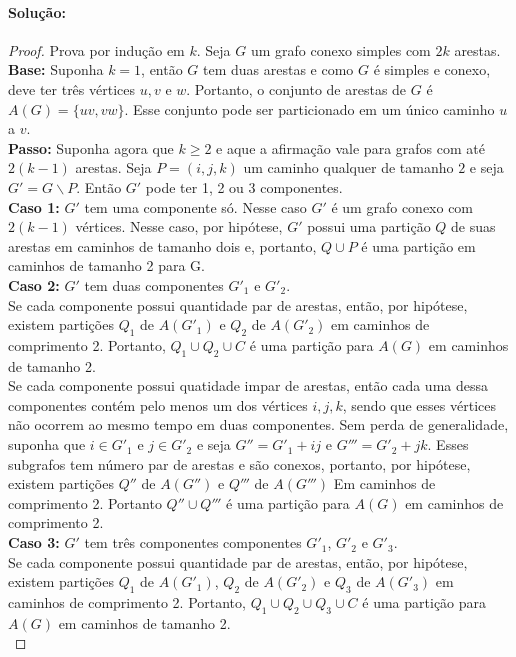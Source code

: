 \documentclass[11pt,a4paper,notitlepage]{exam}
\begin{document}
\paragraph*{Solução:}
\begin{proof}
  Prova por indução em $k$. Seja $G$ um grafo conexo simples com $2k$ arestas.\\
  \textbf{Base:}
  Suponha $k = 1$, então $G$ tem duas arestas e como $G$ é simples e conexo, deve ter três vértices $u, v$ e $w$. Portanto, o conjunto de arestas de $G$ é $A(G) = \{uv, vw\}$. Esse conjunto pode ser particionado em um único caminho $u$ a $v$.\\
  \textbf{Passo:} Suponha agora que $k \geq 2$ e aque a afirmação vale para grafos com até $2(k-1)$ arestas. Seja $P = (i,j,k)$ um caminho qualquer de tamanho $2$ e seja $G' = G \backslash P$. Então $G'$ pode ter 1, 2 ou 3 componentes.\\
  \textbf{Caso 1:} $G'$ tem uma componente só.
  Nesse caso $G'$ é um grafo conexo com $2(k-1)$ vértices. Nesse caso, por hipótese, $G'$ possui uma partição $Q$ de suas arestas em caminhos de tamanho dois e, portanto, $Q\cup P$ é uma partição em caminhos de tamanho 2 para G.\\
  \textbf{Caso 2:} $G'$ tem duas componentes $G'_1$ e $G'_2$.\\
  Se cada componente possui quantidade par de arestas, então, por hipótese, existem partições $Q_1$ de $A(G'_1)$ e $Q_2$ de $A(G'_2)$ em caminhos de comprimento 2. Portanto, $Q_1\cup Q_2 \cup C$ é uma partição para $A(G)$ em caminhos de tamanho 2.\\
  Se cada componente possui quatidade impar de arestas, então cada uma dessa componentes contém pelo menos um dos vértices $i,j,k$, sendo que esses vértices não ocorrem ao mesmo tempo em duas componentes. Sem perda de generalidade, suponha que $i \in G'_1$ e $j \in G'_2$ e seja $G'' = G'_1 + ij$ e $G''' = G'_2 + jk$. Esses subgrafos tem número par de arestas e são conexos, portanto, por hipótese, existem partições $Q''$ de $A(G'')$ e $Q'''$ de $A(G''')$ Em caminhos de comprimento 2. Portanto $Q''\cup Q'''$ é uma partição para $A(G)$ em caminhos de comprimento 2.\\
  \textbf{Caso 3:} $G'$ tem três componentes componentes $G'_1$, $G'_2$ e $G'_3$.\\
  Se cada componente possui quantidade par de arestas, então, por hipótese, existem partições $Q_1$ de $A(G'_1)$, $Q_2$ de $A(G'_2)$ e $Q_3$ de $A(G'_3)$ em caminhos de comprimento 2. Portanto, $Q_1\cup Q_2 \cup Q_3 \cup C$ é uma partição para $A(G)$ em caminhos de tamanho 2.\\

\end{proof}
\end{document}
